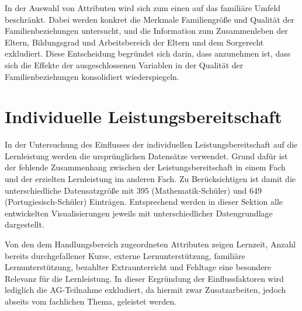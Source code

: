 In der Auswahl von Attributen wird sich zum einen auf das familiäre Umfeld beschränkt. 
Dabei werden konkret die Merkmale Familiengröße und Qualität der Familienbeziehungen untersucht, und die Information zum Zusammenleben der Eltern, Bildungsgrad und Arbeitsbereich der Eltern und dem Sorgerecht exkludiert.
Diese Entscheidung begründet sich darin, dass anzunehmen ist, dass sich die Effekte der ausgeschlossenen Variablen in der Qualität der Familienbeziehungen konsolidiert wiederspiegeln.


\section{Individuelle Leistungsbereitschaft}

In der Untersuchung des Einflusses der individuellen Leistungsbereitschaft auf die Lernleistung werden die ursprünglichen Datensätze verwendet.
Grund dafür ist der fehlende Zusammenhang zwischen der Leistungsbereitschaft in einem Fach und der erzielten Lernleistung im anderen Fach.
Zu Berücksichtigen ist damit die unterschiedliche Datensatzgröße mit 395 (Mathematik-Schüler) und 649 (Portugiesisch-Schüler) Einträgen.
Entsprechend werden in dieser Sektion alle entwickelten Visualisierungen jeweils mit unterschiedlicher Datengrundlage dargestellt.

Von den dem Handlungsbereich zugeordneten Attributen zeigen Lernzeit, Anzahl bereits durchgefallener Kurse, externe
Lernunterstützung, familiäre Lernunterstützung, bezahlter Extraunterricht und Fehltage eine besondere Relevanz für die Lernleistung. 
In dieser Ergründung der Einflussfaktoren wird lediglich die AG-Teilnahme exkludiert, da hiermit zwar Zusatzarbeiten, jedoch abseits vom fachlichen Thema, geleistet werden.

    
